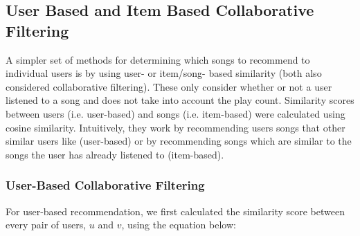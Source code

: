 \documentclass[12pt,preprint]{aastex}
\begin{document}
%


\subsection{User Based and Item Based Collaborative Filtering}

A simpler set of methods for determining which songs to recommend to individual users is by using user- or item/song- based similarity (both also considered collaborative filtering). These only consider whether or not a user listened to a song and does not take into account the play count. Similarity scores between users (i.e. user-based) and songs (i.e. item-based) were calculated using cosine similarity. Intuitively, they work by recommending users songs that other similar users like (user-based) or by recommending songs which are similar to the songs the user has already listened to (item-based).

\subsubsection{User-Based Collaborative Filtering}

For user-based recommendation, we first calculated the similarity score between every pair of users, $u$ and $v$, using the equation below:
\end{document}
